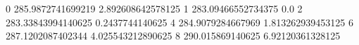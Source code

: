 0 285.9872741699219 2.892608642578125
1 283.09466552734375 0.0
2 283.33843994140625 0.2437744140625
4 284.9079284667969 1.813262939453125
6 287.1202087402344 4.025543212890625
8 290.015869140625 6.92120361328125
